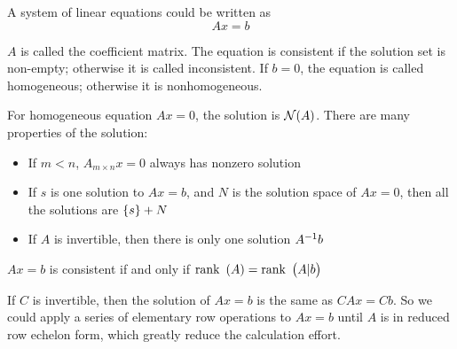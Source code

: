 A system of linear equations could be written as 
\begin{equation}
    A x = b
\end{equation}

$A$ is called the coefficient matrix. The equation is consistent if the solution set is non-empty; otherwise it is called inconsistent. If $b=0$, the equation is called homogeneous; otherwise it is nonhomogeneous.

For homogeneous equation $Ax=0$, the solution is $\mathcal{N}(A)$. There are many properties of the solution:
\begin{itemize}
    \item If $m < n$, $A_{m \times n} x = 0$ always has nonzero solution
    \item If $s$ is one solution to $Ax=b$, and $N$ is the solution space of $Ax=0$, then all the solutions are $\set{s} + N$
    \item If $A$ is invertible, then there is only one solution ${A}^{-1} b$
\end{itemize}


\begin{theorem}
    $Ax=b$ is consistent if and only if $\displaystyle \mathrm{rank}~\left( A \right) = \displaystyle \mathrm{rank}~\left( A|b \right)$
\end{theorem}

If $C$ is invertible, then the solution of $Ax=b$ is the same as $CAx=Cb$. So we could apply a series of elementary row operations to $Ax=b$ until $A$ is in reduced row echelon form, which greatly reduce the calculation effort. 













































